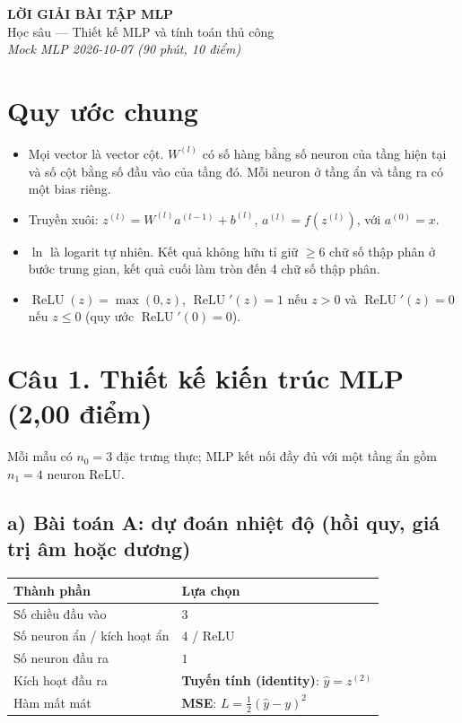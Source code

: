 \documentclass[12pt,a4paper]{article}
\newcommand{\relu}{\operatorname{ReLU}}
\begin{document}
\begin{center}
  {\Large\bfseries LỜI GIẢI BÀI TẬP MLP}\\[2pt]
  {\large Học sâu --- Thiết kế MLP và tính toán thủ công}\\[2pt]
  \textit{Mock MLP 2026-10-07 \quad (90 phút, 10 điểm)}
\end{center}

\section*{Quy ước chung}
\begin{itemize}
  \item Mọi vector là vector cột. $W^{(l)}$ có số hàng bằng số neuron của tầng hiện tại và số cột bằng số đầu vào của tầng đó. Mỗi neuron ở tầng ẩn và tầng ra có một bias riêng.
  \item Truyền xuôi: $z^{(l)} = W^{(l)} a^{(l-1)} + b^{(l)}$, $a^{(l)} = f(z^{(l)})$, với $a^{(0)} = x$.
  \item $\ln$ là logarit tự nhiên. Kết quả không hữu tỉ giữ $\ge 6$ chữ số thập phân ở bước trung gian, kết quả cuối làm tròn đến 4 chữ số thập phân.
  \item $\relu(z)=\max(0,z)$, $\relu'(z)=1$ nếu $z>0$ và $\relu'(z)=0$ nếu $z\le 0$ (quy ước $\relu'(0)=0$).
\end{itemize}

\section*{Câu 1. Thiết kế kiến trúc MLP (2,00 điểm)}

Mỗi mẫu có $n_0 = 3$ đặc trưng thực; MLP kết nối đầy đủ với một tầng ẩn gồm $n_1=4$ neuron ReLU.

\subsection*{a) Bài toán A: dự đoán nhiệt độ (hồi quy, giá trị âm hoặc dương)}

\begin{center}
\begin{tabular}{@{}ll@{}}
\toprule
Thành phần & Lựa chọn \\
\midrule
Số chiều đầu vào & $3$ \\
Số neuron ẩn / kích hoạt ẩn & $4$ / ReLU \\
Số neuron đầu ra & $1$ \\
Kích hoạt đầu ra & \textbf{Tuyến tính (identity)}: $\hat y = z^{(2)}$ \\
Hàm mất mát & \textbf{MSE}: $L=\tfrac12(\hat y-y)^2$ \\
\bottomrule
\end{tabular}
\end{center}
\end{document}
